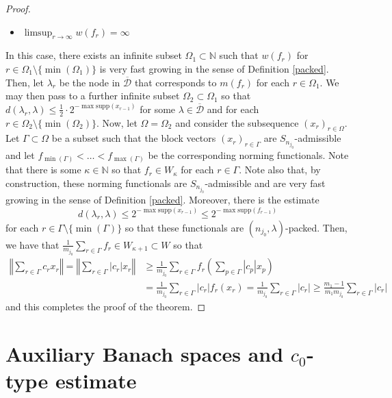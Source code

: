 \documentclass[12pt,a4paper]{amsart}
\newcommand{\N}{\mathbb{N}}
\newcommand{\bes}{\begin{equation*}}
\newcommand{\ees}{\end{equation*}}
\newcommand{\supp}{\text{supp}}
\theoremstyle{definition}
\theoremstyle{plain}
\begin{document}
\begin{proof}
\begin{itemize}
\item[\textbf{(ii)}] $\limsup_{r\to\infty}w(f_{r})=\infty$
\end{itemize}
In this case, there exists an infinite subset $\Omega_{1}\subset\N$ such that $w(f_{r})$ for $r\in\Omega_{1}\setminus\{\min(\Omega_{1})\}$ is very fast growing in the sense of Definition \ref{packed}. Then, let $\lambda_{r}$ be the node in $\overline{\mathcal{D}}$ that corresponds to $m(f_{r})$ for each $r\in\Omega_{1}$. We may then pass to a further infinite subset $\Omega_{2}\subset\Omega_{1}$ so that $d(\lambda_{r},\lambda)\leq \frac{1}{2}\cdot 2^{-\max\supp(x_{r-1})}$ for some $\lambda\in\overline{\mathcal{D}}$ and for each $r\in\Omega_{2}\setminus\{\min(\Omega_{2})\}$. Now, let $\Omega=\Omega_{2}$ and consider the subsequence $(x_{r})_{r\in\Omega}$. Let $\Gamma\subset\Omega$ be a subset such that the block vectors $(x_{r})_{r\in\Gamma}$ are $S_{n_{j_{0}}}$-admissible and let $f_{\min(\Gamma)}<\ldots<f_{\max(\Gamma)}$ be the corresponding norming functionals. Note that there is some $\kappa\in\N$ so that $f_{r}\in W_{\kappa}$ for each $r\in\Gamma$. Note also that, by construction, these norming functionals are $S_{n_{j_{0}}}$-admissible and are very fast growing in the sense of Definition \ref{packed}. Moreover, there is the estimate
\bes d(\lambda_{r},\lambda)\leq 2^{-\max\supp(x_{r-1})}\leq 2^{-\max\supp(f_{r-1})} \ees
for each $r\in\Gamma\setminus\{\min(\Gamma)\}$ so that these functionals are $(n_{j_{0}},\lambda)$-packed. Then, we have that $\frac{1}{m_{j_{0}}}\sum_{r\in\Gamma}f_{r}\in W_{\kappa+1}\subset W$ so that
\begin{align*} \left\Vert \sum_{r\in\Gamma}c_{r}x_{r}\right\Vert =\left\Vert \sum_{r\in\Gamma}|c_{r}|x_{r}\right\Vert &\geq \frac{1}{m_{j_{0}}}\sum_{r\in\Gamma}f_{r}\left(\sum_{p\in\Gamma}|c_{p}|x_{p}\right) \\ &=\frac{1}{m_{j_{0}}}\sum_{r\in\Gamma}|c_{r}|f_{r}(x_{r})=\frac{1}{m_{j_{0}}}\sum_{r\in\Gamma}|c_{r}|\geq\frac{m_{1}-1}{m_{1}m_{j_{0}}}\sum_{r\in\Gamma}|c_{r}| \end{align*}
and this completes the proof of the theorem.
\end{proof}

\section{Auxiliary Banach spaces and $c_{0}$-type estimate}{\label{sec4}}
\end{document}
